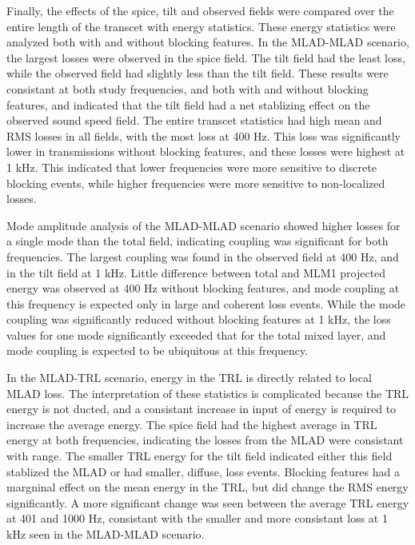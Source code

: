 \documentclass[preprint,NumberedRefs]{JASA}
\begin{document}
Finally, the effects of the spice, tilt and observed fields were compared over the entire length of the transcet with energy statistics. These energy statistics were analyzed both with and without blocking features. In the MLAD-MLAD scenario, the largest losses were observed in the spice field. The tilt field had the least loss, while the observed field had slightly less than the tilt field. These results were consistant at both study frequencies, and both with and without blocking features, and indicated that the tilt field had a net stablizing effect on the observed sound speed field. The entire transcet statistics had high mean and RMS losses in all fields, with the most loss at 400 Hz. This loss was significantly lower in transmissions without blocking features, and these losses were highest at 1 kHz. This indicated that lower frequencies were more sensitive to discrete blocking events, while higher frequencies were more sensitive to non-localized losses.

Mode amplitude analysis of the MLAD-MLAD scenario showed higher losses for a single mode than the total field, indicating coupling was significant for both frequencies. The largest coupling was found in the observed field at 400 Hz, and in the tilt field at 1 kHz. Little difference between total and MLM1 projected energy was observed at 400 Hz without blocking features, and mode coupling at this frequency is expected only in large and coherent loss events. While the mode coupling was significantly reduced without blocking features at 1 kHz, the loss values for one mode significantly exceeded that for the total mixed layer, and mode coupling is expected to be ubiquitous at this frequency.

In the MLAD-TRL scenario, energy in the TRL is directly related to local MLAD loss. The interpretation of these statistics is complicated because the TRL energy is not ducted, and a consistant increase in input of energy is required to increase the average energy. The spice field had the highest average in TRL energy at both frequencies, indicating the losses from the MLAD were consistant with range. The smaller TRL energy for the tilt field indicated either this field stablized the MLAD or had smaller, diffuse, loss events. Blocking features had a margninal effect on the mean energy in the TRL, but did change the RMS energy significantly. A more significant change was seen between the average TRL energy at 401 and 1000 Hz, consistant with the smaller and more consistant loss at 1 kHz seen in the MLAD-MLAD scenario.
\end{document}
